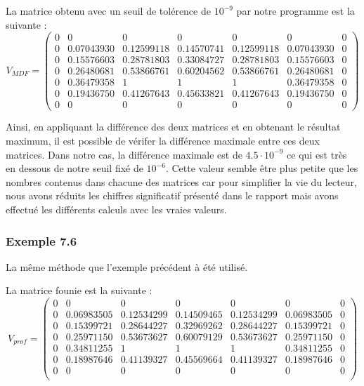 La matrice obtenu avec un seuil de tolérence de $10^{-9}$ par notre programme est la suivante :
\[V_{MDF}  = \left(\begin{array}{ccccccc}
0 & 0 			& 0 			& 0 			& 0 			& 0 			& 0 \\
0 & 0.07043930 	& 0.12599118 	& 0.14570741	& 0.12599118	& 0.07043930 	& 0 \\
0 & 0.15576603 	& 0.28781803 	& 0.33084727 	& 0.28781803 	& 0.15576603 	& 0 \\
0 & 0.26480681 	& 0.53866761 	& 0.60204562  	& 0.53866761 	& 0.26480681 	& 0 \\
0 & 0.36479358 	& 1				& 1				& 1			 	& 0.36479358 	& 0 \\
0 & 0.19436750 	& 0.41267643 	& 0.45633821	& 0.41267643 	& 0.19436750 	& 0 \\
0 & 0 			& 0 			& 0 			& 0 			& 0 			& 0 
\end{array} \right)\]

Ainsi, en appliquant la différence des deux matrices et en obtenant le résultat maximum, il est possible de vérifer la différence maximale entre ces deux matrices. Dans notre cas, la différence maximale est de $4.5 \cdot 10^{-9}$ ce qui est très en dessous de notre seuil fixé de $10^{-6}$. Cette valeur semble être plus petite que les nombres contenus dans chacune des matrices car pour simplifier la vie du lecteur, nous avons réduits les chiffres significatif présenté dans le rapport mais avons effectué les différents calculs avec les vraies valeurs.

\subsubsection{Exemple 7.6}
La même méthode que l'exemple précédent à été utilisé.

La matrice founie est la suivante :
\[V_{prof}  = \left(\begin{array}{ccccccc}
0 & 0 			& 0 			& 0 			& 0 			& 0 			& 0 \\
0 & 0.06983505 	& 0.12534299 	& 0.14509465	& 0.12534299	& 0.06983505 	& 0 \\
0 & 0.15399721 	& 0.28644227 	& 0.32969262 	& 0.28644227 	& 0.15399721 	& 0 \\
0 & 0.25971150 	& 0.53673627 	& 0.60079129  	& 0.53673627 	& 0.25971150 	& 0 \\
0 & 0.34811255 	& 1				& 1				& 1			 	& 0.34811255 	& 0 \\
0 & 0.18987646 	& 0.41139327 	& 0.45569664	& 0.41139327 	& 0.18987646 	& 0 \\
0 & 0 			& 0 			& 0 			& 0 			& 0 			& 0 \\
\end{array} \right)\]

